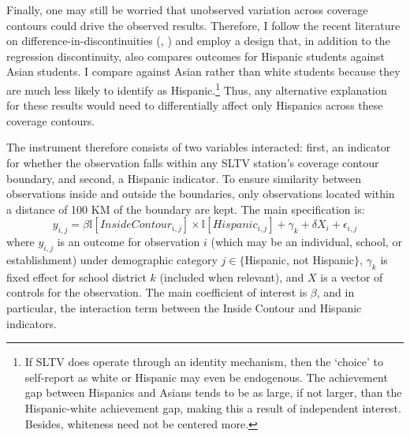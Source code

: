 \documentclass[11pt]{article}
\begin{document}
Finally, one may still be worried that unobserved variation across coverage contours could drive the observed results. Therefore, I follow the recent literature on difference-in-discontinuities (\cite{casas2015women}, \cite{grembi2016fiscal}) and employ a design that, in addition to the regression discontinuity, also compares outcomes for Hispanic students against Asian students. I compare against Asian rather than white students because they are much less likely to identify as Hispanic.\footnote{ If SLTV does operate through an identity mechanism, then the `choice' to self-report as white or Hispanic may even be endogenous. The achievement gap between Hispanics and Asians tends to be as large, if not larger, than the Hispanic-white achievement gap, making this a result of independent interest. Besides, whiteness need not be centered more.} Thus, any alternative explanation for these results would need to differentially affect only Hispanics across these coverage contours.

The instrument therefore consists of two variables interacted: first, an indicator for whether the observation falls within any SLTV station's coverage contour boundary, and second, a Hispanic indicator. To ensure similarity between observations inside and outside the boundaries, only observations located within a distance of 100 KM of the boundary are kept. The main specification is: %
\[ y_{i,j} =  \beta \mathbb{I}[InsideContour_{i,j}] \times \mathbb{I}[Hispanic_{i,j}] + \gamma_k + \delta  X_i + \epsilon_{i,j} \]
where $y_{i,j}$ is an outcome for observation $i$ (which may be an individual, school, or establishment) under demographic category $j \in \{$Hispanic, not Hispanic$\}$, $\gamma_k$ is fixed effect for school district $k$ (included when relevant), and $X$ is a vector of controls for the observation. The main coefficient of interest is $\beta$, and in particular, the interaction term between the Inside Contour and Hispanic indicators. 
\end{document}
